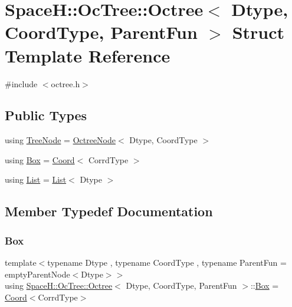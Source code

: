 \hypertarget{struct_space_h_1_1_oc_tree_1_1_octree}{}\section{SpaceH\+:\+:Oc\+Tree\+:\+:Octree$<$ Dtype, Coord\+Type, Parent\+Fun $>$ Struct Template Reference}
\label{struct_space_h_1_1_oc_tree_1_1_octree}


{\ttfamily \#include $<$octree.\+h$>$}

\subsection*{Public Types}
\begin{DoxyCompactItemize}
\item 
using \mbox{\hyperlink{struct_space_h_1_1_oc_tree_1_1_octree_a5f0a7881da3fe77ffa83c83283202917}{Tree\+Node}} = \mbox{\hyperlink{struct_space_h_1_1_oc_tree_1_1_octree_node}{Octree\+Node}}$<$ Dtype, Coord\+Type $>$
\item 
using \mbox{\hyperlink{struct_space_h_1_1_oc_tree_1_1_octree_a31d92f17b44eff8b7f80dd647de17176}{Box}} = \mbox{\hyperlink{struct_space_h_1_1_oc_tree_1_1_coord}{Coord}}$<$ Corrd\+Type $>$
\item 
using \mbox{\hyperlink{struct_space_h_1_1_oc_tree_1_1_octree_a0a18ebc4ba2cd75e96390866501d4c4a}{List}} = \mbox{\hyperlink{struct_space_h_1_1_oc_tree_1_1_octree_a0a18ebc4ba2cd75e96390866501d4c4a}{List}}$<$ Dtype $>$
\end{DoxyCompactItemize}


\subsection{Member Typedef Documentation}
\mbox{\label{struct_space_h_1_1_oc_tree_1_1_octree_a31d92f17b44eff8b7f80dd647de17176}} 
\subsubsection{\texorpdfstring{Box}{Box}}
{\footnotesize\ttfamily template$<$typename Dtype , typename Coord\+Type , typename Parent\+Fun  = empty\+Parent\+Node$<$\+Dtype$>$$>$ \\
using \mbox{\hyperlink{struct_space_h_1_1_oc_tree_1_1_octree}{Space\+H\+::\+Oc\+Tree\+::\+Octree}}$<$ Dtype, Coord\+Type, Parent\+Fun $>$\+::\mbox{\hyperlink{struct_space_h_1_1_oc_tree_1_1_octree_a31d92f17b44eff8b7f80dd647de17176}{Box}} =  \mbox{\hyperlink{struct_space_h_1_1_oc_tree_1_1_coord}{Coord}}$<$Corrd\+Type$>$}

